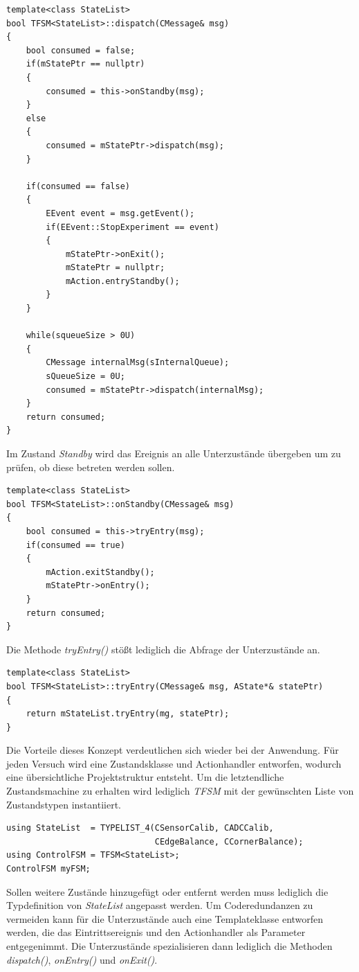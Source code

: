\begin{lstlisting}[caption={Definition der Methode \textit{dispatch()}},captionpos=b]
template<class StateList>
bool TFSM<StateList>::dispatch(CMessage& msg)
{
	bool consumed = false;
	if(mStatePtr == nullptr)
	{
		consumed = this->onStandby(msg);
	}
	else
	{
		consumed = mStatePtr->dispatch(msg);
	}
	
	if(consumed == false)
	{
		EEvent event = msg.getEvent();
		if(EEvent::StopExperiment == event)
		{
			mStatePtr->onExit();
			mStatePtr = nullptr;
			mAction.entryStandby();
		}
	}
	
	while(squeueSize > 0U)
	{
		CMessage internalMsg(sInternalQueue);
		sQueueSize = 0U;
		consumed = mStatePtr->dispatch(internalMsg);
	}
	return consumed;
}
\end{lstlisting}
Im Zustand \textit{Standby} wird das Ereignis an alle Unterzustände übergeben um zu prüfen, ob diese betreten werden sollen. 
\begin{lstlisting}[caption={Implementierung der Methode \textit{onStandby()}},captionpos=b]
template<class StateList>
bool TFSM<StateList>::onStandby(CMessage& msg)
{
	bool consumed = this->tryEntry(msg);
	if(consumed == true)
	{
		mAction.exitStandby();
		mStatePtr->onEntry();
	}
	return consumed;
}
\end{lstlisting}
Die Methode \textit{tryEntry()} stößt lediglich die Abfrage der Unterzustände an.
\begin{lstlisting}[caption={Implementierung der Methode \textit{tryEntry()}},captionpos=b]
template<class StateList>
bool TFSM<StateList>::tryEntry(CMessage& msg, AState*& statePtr)
{
	return mStateList.tryEntry(mg, statePtr);
}
\end{lstlisting}
Die Vorteile dieses Konzept verdeutlichen sich wieder bei der Anwendung. Für jeden Versuch wird eine Zustandsklasse und Actionhandler entworfen, wodurch eine übersichtliche Projektstruktur entsteht. Um die letztendliche Zustandsmachine zu erhalten wird lediglich \textit{TFSM} mit der gewünschten Liste von Zustandstypen instantiiert.
\begin{lstlisting}[caption={Beispielhafte Instantiierung der Zustandsmaschine},captionpos=b]
using StateList  = TYPELIST_4(CSensorCalib, CADCCalib, 
                              CEdgeBalance, CCornerBalance);
using ControlFSM = TFSM<StateList>;
ControlFSM myFSM;
\end{lstlisting}
Sollen weitere Zustände hinzugefügt oder entfernt werden muss lediglich die Typdefinition von \textit{StateList} angepasst werden. Um Coderedundanzen zu vermeiden kann für die Unterzustände auch eine Templateklasse entworfen werden, die das Eintrittsereignis und den Actionhandler als Parameter entgegenimmt. Die Unterzustände spezialisieren dann lediglich die Methoden \textit{dispatch()}, \textit{onEntry()} und \textit{onExit()}.
